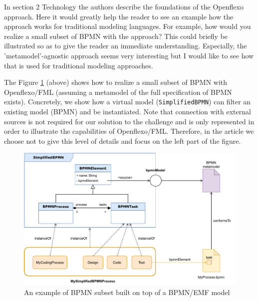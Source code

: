 \documentclass[10pt]{article}
\begin{document}
\begin{response}{In section 2 Technology the authors describe the foundations of the Openflexo approach. Here it would greatly help the reader to see an example how the approach works for traditional modeling languages. For example, how would you realize a small subset of BPMN with the approach? This could briefly be illustrated so as to give the reader an immediate understanding. Especially, the 'metamodel'-agnostic approach seems very interesting but I would like to see how that is used for traditional modeling approaches.}

The Figure \ref{fig:BPMNSubsetExample} (above) shows how to realize a small subset of BPMN with Openflexo/FML (assuming a metamodel of the full specification of BPMN exists). Concretely, we show  how a virtual model (\texttt{SimplifiedBPMN}) can filter an existing model (BPMN) and be instantiated. Note that connection with external sources is not required for our solution to the challenge and is only represented in order to illustrate the capabilities of Openflexo/FML. Therefore, in the article we choose not to give this level of details and focus on the left part of the figure.


\begin{figure}[t]
    \centering
    \includegraphics[width=1.0 \textwidth]{Figures/BPMNSubsetExampleWithExternalConnexion.pdf}
    \caption{An example of BPMN subset built on top of a BPMN/EMF model}
    \label{fig:BPMNSubsetExample}
\end{figure}



\end{response}
\end{document}
